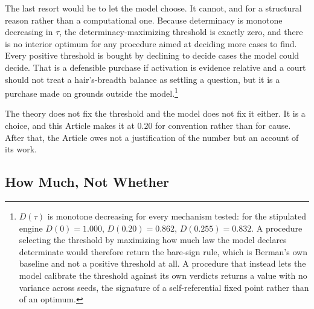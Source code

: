 The last resort would be to let the model choose. It cannot, and for a
structural reason rather than a computational one. Because determinacy is
monotone decreasing in $\tau$, the determinacy-maximizing threshold is
exactly zero, and there is no interior optimum for any procedure aimed at
deciding more cases to find. Every positive threshold is bought by
declining to decide cases the model could decide. That is a defensible
purchase if activation is evidence relative and a court should not treat
a hair's-breadth balance as settling a question, but it is a purchase
made on grounds outside the model.\footnote{$D(\tau)$ is monotone
decreasing for every mechanism tested: for the stipulated engine
$D(0) = 1.000$, $D(0.20) = 0.862$, $D(0.255) = 0.832$. A procedure
selecting the threshold by maximizing how much law the model declares
determinate would therefore return the bare-sign rule, which is Berman's
own baseline and not a positive threshold at all. A procedure that
instead lets the model calibrate the threshold against its own verdicts
returns a value with no variance across seeds, the signature of a
self-referential fixed point rather than of an optimum.}

The theory does not fix the threshold and the model does not fix it
either. It is a choice, and this Article makes it at $0.20$ for
convention rather than for cause. After that, the Article owes not a
justification of the number but an account of its work.

\subsection{How Much, Not Whether}

